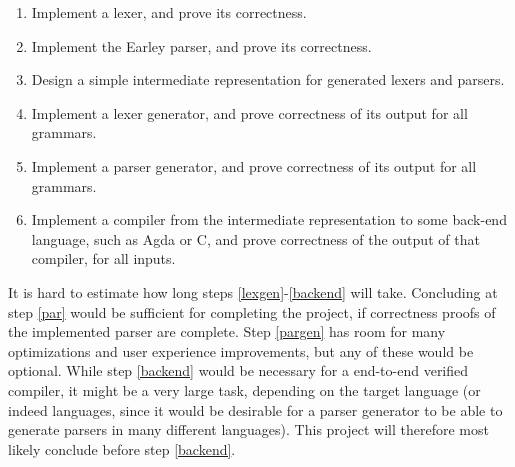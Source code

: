 \documentclass{article}
\begin{document}
	\begin{enumerate}

%

		\item \label{lex}

			Implement a lexer, and prove its correctness.

		\item \label{par}

			Implement the Earley parser, and prove its correctness.

		\item \label{dsl}

			Design a simple intermediate representation for generated lexers
			and parsers.

		\item \label{lexgen}

			Implement a lexer generator, and prove correctness of its output
			for all grammars.

		\item \label{pargen}

			Implement a parser generator, and prove correctness of its output
			for all grammars.

		\item \label{backend}

			Implement a compiler from the intermediate representation to some
			back-end language, such as Agda or C, and prove correctness of the
			output of that compiler, for all inputs.

	\end{enumerate}

	It is hard to estimate how long steps \ref{lexgen}-\ref{backend} will take.
	Concluding at step \ref{par} would be sufficient for completing the
	project, if correctness proofs of the implemented parser are complete.
	Step \ref{pargen} has room for many optimizations and user experience
	improvements, but any of these would be optional. While step \ref{backend}
	would be necessary for a end-to-end verified compiler, it might be a very
	large task, depending on the target language (or indeed languages, since it
	would be desirable for a parser generator to be able to generate parsers in
	many different languages). This project will therefore most likely conclude
	before step \ref{backend}.
\end{document}
